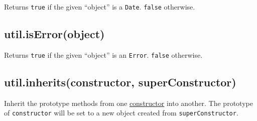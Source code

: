 Returns \texttt{true} if the given ``object'' is a \texttt{Date}.
\texttt{false} otherwise.

\begin{Shaded}
\begin{Highlighting}[]
 \NormalTok{(}\NormalTok{);}

\NormalTok{(} \NormalTok{())}
\NormalTok{(}\NormalTok{())}
\NormalTok{(\{\})}
\end{Highlighting}
\end{Shaded}

\subsection{util.isError(object)}\label{util.iserrorobject}

Returns \texttt{true} if the given ``object'' is an \texttt{Error}.
\texttt{false} otherwise.

\begin{Shaded}
\begin{Highlighting}[]
 \NormalTok{(}\NormalTok{);}

\NormalTok{(} \NormalTok{())}
\NormalTok{(} \NormalTok{())}
\NormalTok{(\{ }\NormalTok{: }\NormalTok{, }\NormalTok{: } \NormalTok{\})}
\end{Highlighting}
\end{Shaded}

\subsection{util.inherits(constructor,
superConstructor)}\label{util.inheritsconstructor-superconstructor}

Inherit the prototype methods from one
\href{https://developer.mozilla.org/en/JavaScript/Reference/Global_Objects/Object/constructor}{constructor}
into another. The prototype of \texttt{constructor} will be set to a new
object created from \texttt{superConstructor}.

